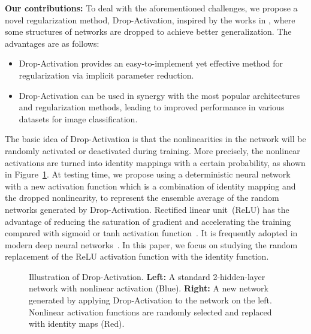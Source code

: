 \documentclass[11pt]{article}
\begin{document}
\textbf{Our contributions:} To deal with the aforementioned challenges, we propose a novel regularization method, Drop-Activation, inspired by the works in \cite{dropout, cutout, stochasticdepth, shakedrop, dropconnect, swapout, zoneout}, where some structures of networks are dropped to achieve better generalization. The advantages are as follows:
\begin{itemize}
    \item Drop-Activation provides an easy-to-implement yet effective method for regularization via implicit parameter reduction.
    \item Drop-Activation can be used in synergy with the most popular architectures and regularization methods, leading to improved performance in various datasets for image classification.
\end{itemize}
The basic idea of Drop-Activation is that the nonlinearities in the network will be randomly activated or deactivated during training. More precisely, the nonlinear activations are turned into identity mappings with a certain probability, as shown in Figure~\ref{fig:DropActMethod}. At testing time, we propose using a deterministic neural network with a new activation function which is a combination of identity mapping and the dropped nonlinearity, to represent the ensemble average of the random networks generated by Drop-Activation. Rectified linear unit~(ReLU) has the advantage of reducing the saturation of gradient and accelerating the training compared with sigmoid or tanh activation function~\cite{verydeep}. It is frequently adopted in modern deep neural networks~\cite{resnet, preresnet, densenet, wrn, resnext}. In this paper, we focus on studying the random replacement of the ReLU activation function with the identity function.

\begin{figure}\centering
    \qquad
    \qquad
    \caption{Illustration of Drop-Activation. \textbf{Left:} A standard 2-hidden-layer network with nonlinear activation (Blue). \textbf{Right:} A new network generated by applying Drop-Activation to the network on the left. Nonlinear activation functions are randomly selected and replaced with identity maps (Red).}\label{fig:DropActMethod}\vspace{-0.5cm}
\end{figure}
\end{document}
